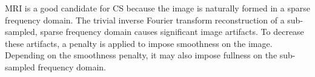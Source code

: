 MRI is a good candidate for CS because the image is naturally formed in a sparse frequency domain. The trivial inverse Fourier transform reconstruction of a sub-sampled, sparse frequency domain causes significant image artifacts. To decrease these artifacts, a penalty is applied to impose smoothness on the image. Depending on the smoothness penalty, it may also impose fullness on the sub-sampled frequency domain. 

